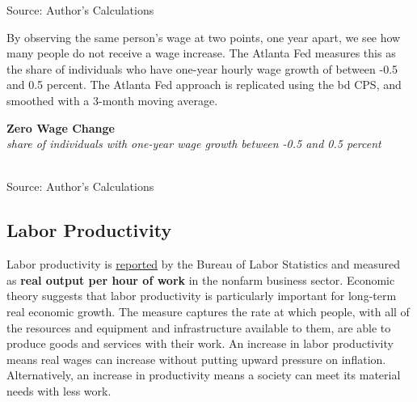 \documentclass{report}
\makeatletter
\newcommand{\tbllink}[1]{\href{https://raw.githubusercontent.com/bdecon/US-chartbook/master/chartbook/data/#1}{\faTable}}
\newcommand*\short[1]{\expandafter\@gobbletwo\number\numexpr#1\relax}
\newcommand{\dateaxisticks}{
		date coordinates in=x, axis line style={draw=none},
		xmax={2021-05-15},
		max space between ticks=40,	    
		xtick={{1990-01-01}, {1992-01-01}, {1994-01-01}, 
			{1996-01-01}, {1998-01-01}, {2000-01-01}, 
			{2002-01-01}, {2004-01-01}, {2006-01-01},
			{2008-01-01}, {2010-01-01}, {2012-01-01}, {2014-01-01},
		    {2016-01-01}, {2018-01-01}, {2020-01-01}},
		minor xtick={{1989-01-01}, {1991-01-01}, {1993-01-01},
			{1995-01-01}, {1997-01-01}, {1999-01-01}, 
			{2001-01-01}, {2003-01-01}, {2005-01-01}, {2007-01-01},
		    {2009-01-01}, {2011-01-01}, {2013-01-01}, {2015-01-01},
		    {2017-01-01}, {2019-01-01}, {2021-01-01}},
		enlarge y limits={0.06}, enlarge x limits={0.01},
		}
\newcommand{\bbar}[2]{extra #1 ticks = {{#2}}, extra #1 tick labels = ,
		extra #1 tick style = {grid=major, grid style={thick, black!25}},}
\newcommand{\stdline}[4]{\addplot[very thick, no markers, color=#1] 
		table [x=#2, y=#3, col sep=comma] {#4};	}
\newcommand{\rebars}{
		\fill[color=black!10] (axis cs:{2007-12-01},\pgfkeysvalueof{/pgfplots/ymin}) rectangle 
			(axis cs:{2009-07-01}, \pgfkeysvalueof{/pgfplots/ymax});
		\fill[color=black!10] (axis cs:{2001-03-01},\pgfkeysvalueof{/pgfplots/ymin}) rectangle 
			(axis cs:{2001-11-01}, \pgfkeysvalueof{/pgfplots/ymax});
		\fill[color=black!10] (axis cs:{2020-02-01},\pgfkeysvalueof{/pgfplots/ymin}) rectangle 
			(axis cs:{2021-05-15}, \pgfkeysvalueof{/pgfplots/ymax});}
\makeatother
\begin{document}
{{\begin{minipage}{0.76\textwidth}
\footnotesize{Source: Author's Calculations} \hfill \tbllink{atl_wgt.csv}
\vspace{6mm}

\small By observing the same person's wage at two points, one year apart, we see how many people do not receive a wage increase. The Atlanta Fed measures this as the share of individuals who have one-year hourly wage growth of between -0.5 and 0.5 percent. The Atlanta Fed approach is replicated using the bd CPS, and smoothed with a 3-month moving average. 
\vspace{2mm}

\normalsize \textbf{Zero Wage Change}\\
\footnotesize{\textit{share of individuals with one-year wage growth between -0.5 and 0.5 percent}}\\
\hspace*{-2mm} \\
\footnotesize{Source: Author's Calculations} \hspace{59mm} \tbllink{atl_wgt.csv}
\end{minipage}
\newpage
\begin{minipage}{0.76\textwidth}
\subsection*{\color{black!70} \seriffont Labor Productivity}
\small Labor productivity is \href{https://www.bls.gov/news.release/prod2.nr0.htm}{reported} by the Bureau of Labor Statistics and measured as \textbf{real output per hour of work} in the nonfarm business sector. Economic theory suggests that labor productivity is particularly important for long-term real economic growth. The measure captures the rate at which people, with all of the resources and equipment and infrastructure available to them, are able to produce goods and services with their work. An increase in labor productivity means real wages can increase without putting upward pressure on inflation. Alternatively, an increase in productivity means a society can meet its material needs with less work.


\end{minipage}}}
\end{document}
